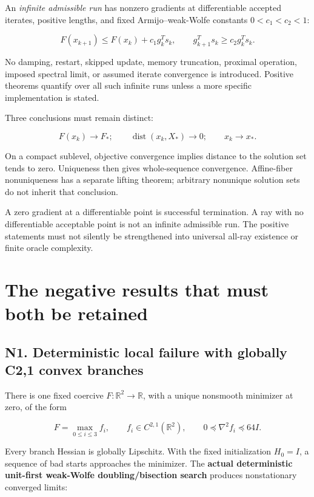 An \emph{infinite admissible run} has nonzero gradients at differentiable accepted iterates, positive lengths, and fixed Armijo--weak-Wolfe constants \(0<c_1<c_2<1\):

\[
 F(x_{k+1})\le F(x_k)+c_1g_k^Ts_k,\qquad
 g_{k+1}^Ts_k\ge c_2g_k^Ts_k.
\]

No damping, restart, skipped update, memory truncation, proximal operation, imposed spectral limit, or assumed iterate convergence is introduced. Positive theorems quantify over all such infinite runs unless a more specific implementation is stated.

Three conclusions must remain distinct:

\[
 F(x_k)\to F_*;\qquad \operatorname{dist}(x_k,X_*)\to0;\qquad x_k\to x_*.
\]

On a compact sublevel, objective convergence implies distance to the solution set tends to zero. Uniqueness then gives whole-sequence convergence. Affine-fiber nonuniqueness has a separate lifting theorem; arbitrary nonunique solution sets do not inherit that conclusion.

A zero gradient at a differentiable point is successful termination. A ray with no differentiable acceptable point is not an infinite admissible run. The positive statements must not silently be strengthened into universal all-ray existence or finite oracle complexity.

\section{The negative results that must both be retained}\label{the-negative-results-that-must-both-be-retained}

\subsection{N1. Deterministic local failure with globally C2,1 convex branches}\label{n1.-deterministic-local-failure-with-globally-c21-convex-branches}

There is one fixed coercive \(F:\mathbb R^2\to\mathbb R\), with a unique nonsmooth minimizer at zero, of the form

\[
 F=\max_{0\le i\le3}f_i,\qquad f_i\in C^{2,1}(\mathbb R^2),\qquad
 0\preceq\nabla^2f_i\preceq64I.
\]

Every branch Hessian is globally Lipschitz. With the fixed initialization \(H_0=I\), a sequence of bad starts approaches the minimizer. The \textbf{actual deterministic unit-first weak-Wolfe doubling/bisection search} produces nonstationary converged limits:

